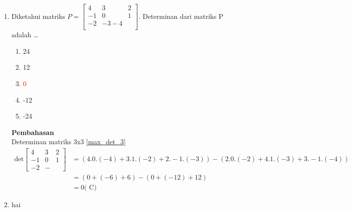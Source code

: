 \documentclass{report}
\newcommand{\options}[5]{
\begin{enumerate}[label=\alph*.]
	\item #1
	\item #2
	\item #3
	\item #4
	\item #5
\end{enumerate}
}
\newcommand{\pemb}{ \textbf{Pembahasan} \\}
\begin{document}
\begin{enumerate}
	\item Diketahui matriks $P = 
	\begin{bmatrix}
	4 & 3 & 2 \\ 
	-1 & 0 & 1 \\ 
	-2 & -3 - 4 \\
	\end{bmatrix}
	$. Determinan dari matriks P adalah \ldots
	\options
	{24}
	{12}
	{\textcolor{red}{0}}
	{-12}
	{-24}
	\pemb
	Determinan matriks 3x3 \ref{max_det_3}
	\begin{align*}
		\text{det}
		\begin{bmatrix}
		4 & 3 & 2 \\ 
		-1 & 0 & 1 \\ 
		-2 & -
		\end{bmatrix} 
		&= (4.0.(-4)+3.1.(-2)+2.-1.(-3)) - (2.0.(-2)+4.1.(-3)+3.-1.(-4)) \\
		&= (0+(-6)+6) - (0+(-12)+12) \\
		&= 0 \text{( C)}
	\end{align*}
	\item hai

\end{enumerate}
\end{document}
